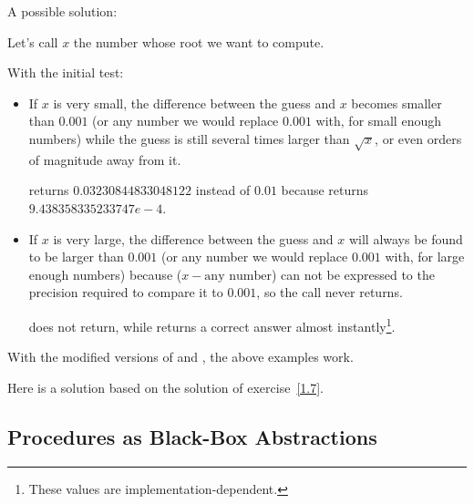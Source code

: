 \begin{exe}[1.7]
    \label{1.7}
    A possible solution:

    Let's call $x$ the number whose root we want to compute.

    With the initial  test:
    \begin{itemize}
        \item If $x$ is very small, the difference between the guess and $x$ 
        becomes smaller than $0.001$ (or any number we would replace $0.001$ 
        with, for small enough numbers) while the guess is still several times 
        larger than $\sqrt{x}$, or even orders of magnitude away from it.
        \begin{example}
             returns $0.03230844833048122$ instead of $0.01$ 
            because\linebreak
            returns\linebreak
            $9.438358335233747e-4$.
        \end{example}
    \item If $x$ is very large, the difference between the guess and $x$ will 
        always be found to be larger than $0.001$ (or any number we would 
        replace $0.001$ with, for large enough numbers) because
        ($x - \text{any number}$) can not be expressed to the precision required 
        to compare it to $0.001$, so the call never returns.
        \begin{example}
             does not return, while  
            returns a correct answer almost instantly\footnote{These values are 
            implementation-dependent.}.
        \end{example}
    \end{itemize}

    With the modified versions of  and , the 
    above examples work.
\end{exe}

\begin{exe}[1.8]
    Here is a solution based on the solution of exercise~\ref{1.7}.
\end{exe}

\subsection{Procedures as Black-Box Abstractions}


